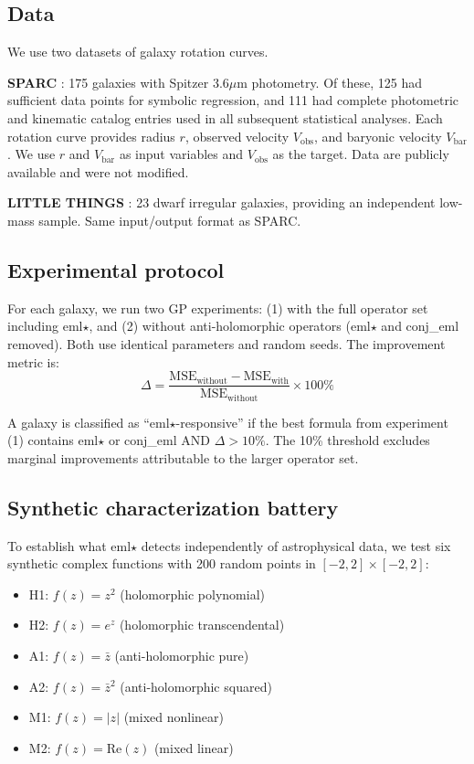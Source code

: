 \documentclass[12pt,a4paper]{article}
\begin{document}
\subsection{Data}

We use two datasets of galaxy rotation curves.

\textbf{SPARC} \citep{Lelli2016}: 175 galaxies with Spitzer 3.6$\mu$m photometry. Of these, 125 had sufficient data points for symbolic regression, and 111 had complete photometric and kinematic catalog entries used in all subsequent statistical analyses. Each rotation curve provides radius $r$, observed velocity $V_\mathrm{obs}$, and baryonic velocity $V_\mathrm{bar}$. We use $r$ and $V_\mathrm{bar}$ as input variables and $V_\mathrm{obs}$ as the target. Data are publicly available and were not modified.

\textbf{LITTLE THINGS} \citep{Hunter2012}: 23 dwarf irregular galaxies, providing an independent low-mass sample. Same input/output format as SPARC.

\subsection{Experimental protocol}

For each galaxy, we run two GP experiments: (1) with the full operator set including eml$\star$, and (2) without anti-holomorphic operators (eml$\star$ and conj\_eml removed). Both use identical parameters and random seeds. The improvement metric is:
\begin{equation}
\Delta = \frac{\mathrm{MSE}_\mathrm{without} - \mathrm{MSE}_\mathrm{with}}{\mathrm{MSE}_\mathrm{without}} \times 100\%
\end{equation}

A galaxy is classified as ``eml$\star$-responsive'' if the best formula from experiment (1) contains eml$\star$ or conj\_eml AND $\Delta > 10\%$. The 10\% threshold excludes marginal improvements attributable to the larger operator set.

\subsection{Synthetic characterization battery}

To establish what eml$\star$ detects independently of astrophysical data, we test six synthetic complex functions with 200 random points in $[-2, 2] \times [-2, 2]$:
\begin{itemize}
\item H1: $f(z) = z^2$ (holomorphic polynomial)
\item H2: $f(z) = e^z$ (holomorphic transcendental)
\item A1: $f(z) = \bar{z}$ (anti-holomorphic pure)
\item A2: $f(z) = \bar{z}^2$ (anti-holomorphic squared)
\item M1: $f(z) = |z|$ (mixed nonlinear)
\item M2: $f(z) = \mathrm{Re}(z)$ (mixed linear)
\end{itemize}
\end{document}
